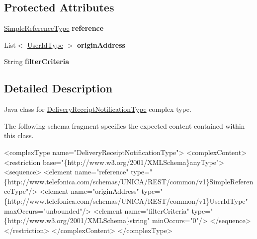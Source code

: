 \subsection*{Protected Attributes}
\begin{DoxyCompactItemize}
\item 
\hypertarget{classcom_1_1telefonica_1_1schemas_1_1unica_1_1rest_1_1sms_1_1v1_1_1DeliveryReceiptNotificationType_aff115c62c6a07ef325910b61657b5621}{
\hyperlink{classcom_1_1telefonica_1_1schemas_1_1unica_1_1rest_1_1common_1_1v1_1_1SimpleReferenceType}{SimpleReferenceType} {\bfseries reference}}
\label{classcom_1_1telefonica_1_1schemas_1_1unica_1_1rest_1_1sms_1_1v1_1_1DeliveryReceiptNotificationType_aff115c62c6a07ef325910b61657b5621}

\item 
\hypertarget{classcom_1_1telefonica_1_1schemas_1_1unica_1_1rest_1_1sms_1_1v1_1_1DeliveryReceiptNotificationType_aae09d245324260143d90bf3b64c6ce9f}{
List$<$ \hyperlink{classcom_1_1telefonica_1_1schemas_1_1unica_1_1rest_1_1common_1_1v1_1_1UserIdType}{UserIdType} $>$ {\bfseries originAddress}}
\label{classcom_1_1telefonica_1_1schemas_1_1unica_1_1rest_1_1sms_1_1v1_1_1DeliveryReceiptNotificationType_aae09d245324260143d90bf3b64c6ce9f}

\item 
\hypertarget{classcom_1_1telefonica_1_1schemas_1_1unica_1_1rest_1_1sms_1_1v1_1_1DeliveryReceiptNotificationType_ada9f18d935b02cc12183ab503e6a49ac}{
String {\bfseries filterCriteria}}
\label{classcom_1_1telefonica_1_1schemas_1_1unica_1_1rest_1_1sms_1_1v1_1_1DeliveryReceiptNotificationType_ada9f18d935b02cc12183ab503e6a49ac}

\end{DoxyCompactItemize}


\subsection{Detailed Description}
Java class for \hyperlink{classcom_1_1telefonica_1_1schemas_1_1unica_1_1rest_1_1sms_1_1v1_1_1DeliveryReceiptNotificationType}{DeliveryReceiptNotificationType} complex type.

The following schema fragment specifies the expected content contained within this class.


\begin{DoxyPre}
 <complexType name="DeliveryReceiptNotificationType">
   <complexContent>
     <restriction base="\{http://www.w3.org/2001/XMLSchema\}anyType">
       <sequence>
         <element name="reference" type="\{http://www.telefonica.com/schemas/UNICA/REST/common/v1\}SimpleReferenceType"/>
         <element name="originAddress" type="\{http://www.telefonica.com/schemas/UNICA/REST/common/v1\}UserIdType" maxOccurs="unbounded"/>
         <element name="filterCriteria" type="\{http://www.w3.org/2001/XMLSchema\}string" minOccurs="0"/>
       </sequence>
     </restriction>
   </complexContent>
 </complexType>
 \end{DoxyPre}
 

